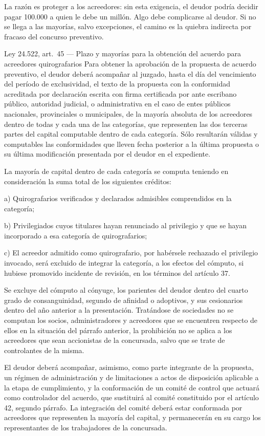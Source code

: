 \documentclass[12pt,oneside]{book}
\begin{document}
La razón es proteger a los acreedores: sin esta exigencia, el deudor podría decidir pagar 100.000 a quien le debe un millón. Algo debe complicarse al deudor. Si no se llega a las mayorías, salvo excepciones, el camino es la quiebra indirecta por fracaso del concurso preventivo.

\begin{norma}{Ley 24.522, art.\ 45 --- Plazo y mayorías para la obtención del acuerdo para acreedores quirografarios}
Para obtener la aprobación de la propuesta de acuerdo preventivo, el deudor deberá acompañar al juzgado, hasta el día del vencimiento del período de exclusividad, el texto de la propuesta con la conformidad acreditada por declaración escrita con firma certificada por ante escribano público, autoridad judicial, o administrativa en el caso de entes públicos nacionales, provinciales o municipales, de la mayoría absoluta de los acreedores dentro de todas y cada una de las categorías, que representen las dos terceras partes del capital computable dentro de cada categoría. Sólo resultarán válidas y computables las conformidades que lleven fecha posterior a la última propuesta o su última modificación presentada por el deudor en el expediente.

La mayoría de capital dentro de cada categoría se computa teniendo en consideración la suma total de los siguientes créditos:

a) Quirografarios verificados y declarados admisibles comprendidos en la categoría;

b) Privilegiados cuyos titulares hayan renunciado al privilegio y que se hayan incorporado a esa categoría de quirografarios;

c) El acreedor admitido como quirografario, por habérsele rechazado el privilegio invocado, será excluido de integrar la categoría, a los efectos del cómputo, si hubiese promovido incidente de revisión, en los términos del artículo 37.

Se excluye del cómputo al cónyuge, los parientes del deudor dentro del cuarto grado de consanguinidad, segundo de afinidad o adoptivos, y sus cesionarios dentro del año anterior a la presentación. Tratándose de sociedades no se computan los socios, administradores y acreedores que se encuentren respecto de ellos en la situación del párrafo anterior, la prohibición no se aplica a los acreedores que sean accionistas de la concursada, salvo que se trate de controlantes de la misma.

El deudor deberá acompañar, asimismo, como parte integrante de la propuesta, un régimen de administración y de limitaciones a actos de disposición aplicable a la etapa de cumplimiento, y la conformación de un comité de control que actuará como controlador del acuerdo, que sustituirá al comité constituido por el artículo 42, segundo párrafo. La integración del comité deberá estar conformada por acreedores que representen la mayoría del capital, y permanecerán en su cargo los representantes de los trabajadores de la concursada.


\end{norma}
\end{document}
